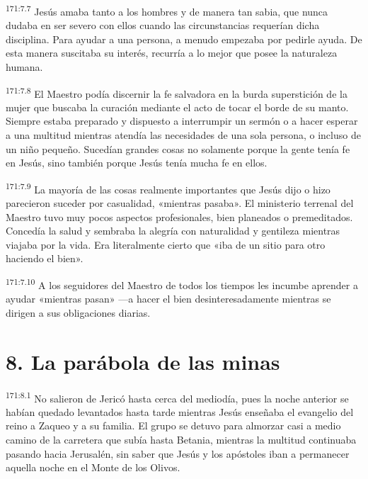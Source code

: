 \par 
\textsuperscript{171:7.7} Jesús amaba tanto a los hombres y de manera tan sabia, que nunca dudaba en ser severo con ellos cuando las circunstancias requerían dicha disciplina. Para ayudar a una persona, a menudo empezaba por pedirle ayuda. De esta manera suscitaba su interés, recurría a lo mejor que posee la naturaleza humana.

\par 
\textsuperscript{171:7.8} El Maestro podía discernir la fe salvadora en la burda superstición de la mujer que buscaba la curación mediante el acto de tocar el borde de su manto. Siempre estaba preparado y dispuesto a interrumpir un sermón o a hacer esperar a una multitud mientras atendía las necesidades de una sola persona, o incluso de un niño pequeño. Sucedían grandes cosas no solamente porque la gente tenía fe en Jesús, sino también porque Jesús tenía mucha fe en ellos.

\par 
\textsuperscript{171:7.9} La mayoría de las cosas realmente importantes que Jesús dijo o hizo parecieron suceder por casualidad, «mientras pasaba». El ministerio terrenal del Maestro tuvo muy pocos aspectos profesionales, bien planeados o premeditados. Concedía la salud y sembraba la alegría con naturalidad y gentileza mientras viajaba por la vida. Era literalmente cierto que «iba de un sitio para otro haciendo el bien».

\par 
\textsuperscript{171:7.10} A los seguidores del Maestro de todos los tiempos les incumbe aprender a ayudar «mientras pasan» ---a hacer el bien desinteresadamente mientras se dirigen a sus obligaciones diarias.

\section*{8. La parábola de las minas}
\par 
\textsuperscript{171:8.1} No salieron de Jericó hasta cerca del mediodía, pues la noche anterior se habían quedado levantados hasta tarde mientras Jesús enseñaba el evangelio del reino a Zaqueo y a su familia. El grupo se detuvo para almorzar casi a medio camino de la carretera que subía hasta Betania, mientras la multitud continuaba pasando hacia Jerusalén, sin saber que Jesús y los apóstoles iban a permanecer aquella noche en el Monte de los Olivos.

